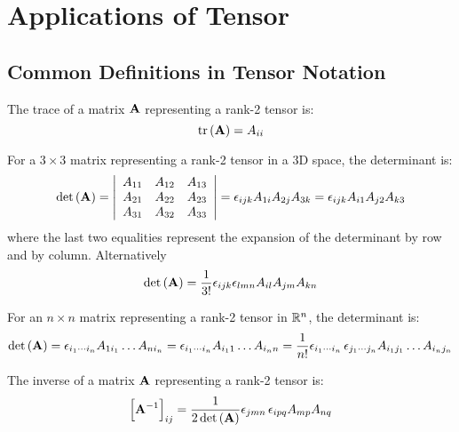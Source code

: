 

 \chapter{Applications of Tensor}


\section{Common Definitions in Tensor Notation\label{subCommonDefinitions}}

 The trace of a matrix $\mathbf{ A}$ representing a rank-2
tensor is:
\begin{equation}
\mathrm{tr}\left(\mathbf{ A}\right)=A_{ii}
\end{equation}


 For a $3\times3$ matrix representing a rank-2 tensor in
a 3D space, the determinant is:
\begin{equation}
\mathrm{det}\left(\mathbf{ A}\right)=\begin{vmatrix}\begin{array}{ccc}
A_{11} & A_{12} & A_{13}\\
A_{21} & A_{22} & A_{23}\\
A_{31} & A_{32} & A_{33}
\end{array}\end{vmatrix}=\epsilon_{ijk}A_{1i}A_{2j}A_{3k}=\epsilon_{ijk}A_{i1}A_
{j2}A_{k3}
\end{equation}
where the last two equalities represent the expansion of the determinant
by row and by column. Alternatively
\begin{equation}
\mathrm{det}\left(\mathbf{ A}\right)=\dfrac{1}{3!}\epsilon_{ijk}\epsilon_{lmn}A_{
il}A_{jm}A_{kn}
\end{equation}


 For an $n\times n$ matrix representing a rank-2 tensor
in $\mathbb{R}^n$, the determinant is:
\begin{equation}
\mathrm{det}\left(\mathbf{ A}\right)=\epsilon_{i_{1}\cdots i_{n}}A_{1i_{1}}\ldots 
A_{ni_{n}}=\epsilon_{i_{1}\cdots i_{n}}A_{i_{1}1}\ldots 
A_{i_{n}n}=\dfrac{1}{n!}\epsilon_{i_{1}\cdots i_{n}}\,\epsilon_{j_{1}\cdots 
j_{n}}A_{i_{1}j_{1}}\ldots A_{i_{n}j_{n}}
\end{equation}


 The inverse of a matrix $\mathbf{ A}$ representing a rank-2
tensor is:
\begin{equation}
\left[\mathbf{ A}^{-1}\right]_{ij}=\dfrac{1}{2\,\mathrm{det}\left(\mathbf{ A}
\right)}\epsilon_{jmn}\,\epsilon_{ipq}A_{mp}A_{nq}
\end{equation}


